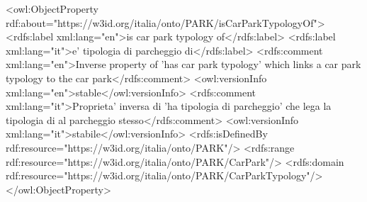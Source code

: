 <owl:ObjectProperty rdf:about="https://w3id.org/italia/onto/PARK/isCarParkTypologyOf">
    <rdfs:label xml:lang="en">is car park typology of</rdfs:label>
    <rdfs:label xml:lang="it">e' tipologia di parcheggio di</rdfs:label>
    <rdfs:comment xml:lang="en">Inverse property of 'has car park typology' which links a car park typology to the car park</rdfs:comment>
    <owl:versionInfo xml:lang="en">stable</owl:versionInfo>
    <rdfs:comment xml:lang="it">Proprieta' inversa di 'ha tipologia di parcheggio' che lega la tipologia di al parcheggio stesso</rdfs:comment>
    <owl:versionInfo xml:lang="it">stabile</owl:versionInfo>
    <rdfs:isDefinedBy rdf:resource="https://w3id.org/italia/onto/PARK"/>
    <rdfs:range rdf:resource="https://w3id.org/italia/onto/PARK/CarPark"/>
    <rdfs:domain rdf:resource="https://w3id.org/italia/onto/PARK/CarParkTypology"/>
</owl:ObjectProperty>